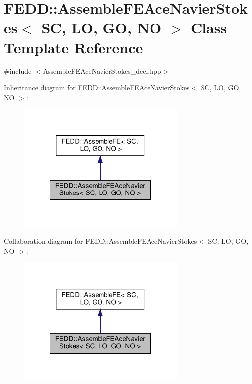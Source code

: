 \hypertarget{classFEDD_1_1AssembleFEAceNavierStokes}{}\section{F\+E\+DD\+:\+:Assemble\+F\+E\+Ace\+Navier\+Stokes$<$ SC, LO, GO, NO $>$ Class Template Reference}
\label{classFEDD_1_1AssembleFEAceNavierStokes}


{\ttfamily \#include $<$Assemble\+F\+E\+Ace\+Navier\+Stokes\+\_\+decl.\+hpp$>$}



Inheritance diagram for F\+E\+DD\+:\+:Assemble\+F\+E\+Ace\+Navier\+Stokes$<$ SC, LO, GO, NO $>$\+:\nopagebreak
\begin{figure}[H]
\begin{center}
\leavevmode
\includegraphics[width=232pt]{classFEDD_1_1AssembleFEAceNavierStokes__inherit__graph}
\end{center}
\end{figure}


Collaboration diagram for F\+E\+DD\+:\+:Assemble\+F\+E\+Ace\+Navier\+Stokes$<$ SC, LO, GO, NO $>$\+:\nopagebreak
\begin{figure}[H]
\begin{center}
\leavevmode
\includegraphics[width=232pt]{classFEDD_1_1AssembleFEAceNavierStokes__coll__graph}
\end{center}
\end{figure}
